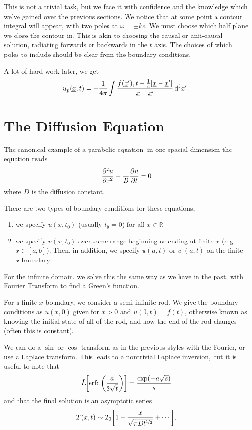 \documentclass[a4paper,12pt,parskip=full,BCOR=1cm]{scrreprt}
\newcommand{\laplace}[1]{\ensuremath{\mathlarger{L}\!\!\left[#1 \right]}}
\DeclareMathOperator{\erfc}{erfc}
\renewcommand{\vec}{\underline}
\begin{document}
This is not a trivial task, but we face it with confidence and the knowledge which we've gained over the previous sections.
We notice that at some point a contour integral will appear, with two poles at $\omega=\pm kc$.
We must choose which half plane we close the contour in.
This is akin to choosing the causal or anti-causal solution, radiating forwards or backwards in the $t$ axis.
The choices of which poles to include should be clear from the boundary conditions.

A lot of hard work later, we get
\begin{equation}
 u_p(\vec{x},t) = -\frac{1}{4\pi}\int \frac{f(\vec{x}^\prime), t- \frac{1}{c}\abs{\vec{x}-\vec{x}^\prime}}{\abs{\vec{x}-\vec{x}^\prime}}\dd[3]{x^\prime}.
\end{equation}

\chapter{The Diffusion Equation}
The canonical example of a parabolic equation, in one spacial dimension the equation reads
$$\pdv[2]{u}{x} - \frac{1}{D}\pdv{u}{t}=0$$
where $D$ is the diffusion constant.

There are two types of boundary conditions for these equations,
\begin{enumerate}
 \item we specify $u(x,t_0)$ (usually $t_0 = 0$) for all $x\in \mathbb{R}$
 \item we specify $u(x,t_0)$ over some range beginning or ending at finite $x$ (e.g.~$x\in[a,b]$).
Then, in addition, we specify $u(a,t)$ or $u^\prime (a,t)$ on the finite $x$ boundary.
\end{enumerate}

For the infinite domain, we solve this the same way as we have in the past, with Fourier Transform to find a Green's function.

For a finite $x$ boundary, we consider a semi-infinite rod.
We give the boundary conditions as $u(x,0)$ given for $x>0$ and $u(0,t)=f(t)$, otherwise known as knowing the initial state of all of the rod, and how the end of the rod changes (often this is constant).

We can do a $\sin$ or $\cos$ transform as in the previous styles with the Fourier, or use a Laplace transform.
This leads to a nontrivial Laplace inversion, but it is useful to note that $$\laplace{\erfc\qty(\frac{a}{2\sqrt{t}})} = \frac{\exp(-a\sqrt s)}{s}$$
and that the final solution is an asymptotic series
$$T(x,t)\sim T_0 \qty[1-\frac{x}{\sqrt{\pi D t^{\nicefrac{1}{2}}}} + \cdots].$$
\end{document}
